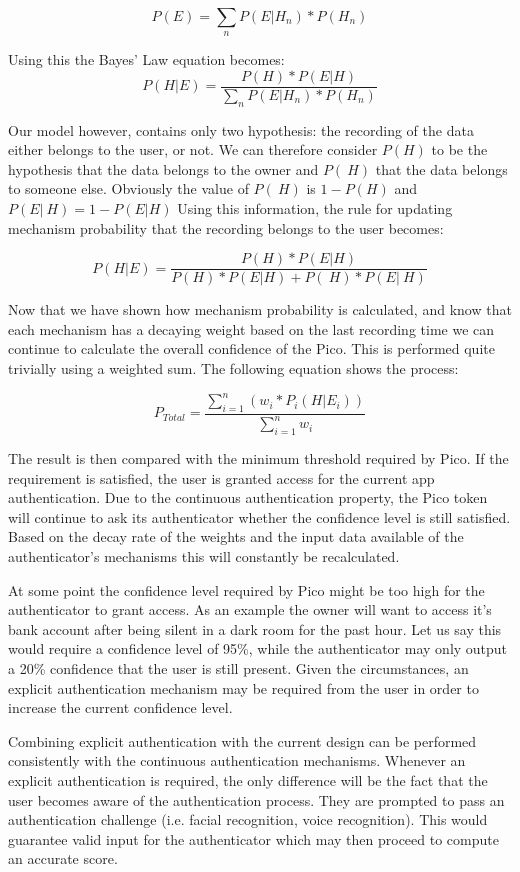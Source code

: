 $$P(E) = \sum_{n}^{}P(E|H_n) * P(H_n)$$

Using this the Bayes' Law equation becomes:
$$P(H|E) = \frac{P(H) * P(E|H)}{\sum_{n}^{}P(E|H_n) * P(H_n)}$$

Our model however, contains only two hypothesis: the recording of the data either belongs to the user, or not. We can therefore consider $P(H)$ to be the hypothesis that the data belongs to the owner and $P(~H)$ that the data belongs to someone else. Obviously the value of $P(~H)$ is $1 - P(H)$ and $P(E|~H) = 1 - P(E|H)$ Using this information, the rule for updating mechanism probability that the recording belongs to the user becomes:

$$P(H|E) = \frac{P(H) * P(E|H)}{P(H) * P(E|H) + P(~H) * P(E|~H)}$$

Now that we have shown how mechanism probability is calculated, and know that each mechanism has a decaying weight based on the last recording time we can continue to calculate the overall confidence of the Pico. This is performed quite trivially using a weighted sum. The following equation shows the process:

$$P_{Total} = \frac{\sum_{i=1}^{n}(w_i * P_i(H|E_i))}{\sum_{i=1}^{n}w_i}$$

The result is then compared with the minimum threshold required by Pico. If the requirement is satisfied, the user is granted access for the current app authentication. Due to the continuous authentication property, the Pico token will continue to ask its authenticator whether the confidence level is still satisfied. Based on the decay rate of the weights and the input data available of the authenticator's mechanisms this will constantly be recalculated.

At some point the confidence level required by Pico might be too high for the authenticator to grant access. As an example the owner will want to access it's bank account after being silent in a dark room for the past hour. Let us say this would require a confidence level of 95\%, while the authenticator may only output a 20\% confidence that the user is still present. Given the circumstances, an explicit authentication mechanism may be required from the user in order to increase the current confidence level. 

Combining explicit authentication with the current design can be performed consistently with the continuous authentication mechanisms. Whenever an explicit authentication is required, the only difference will be the fact that the user becomes aware of the authentication process. They are prompted to pass an authentication challenge (i.e. facial recognition, voice recognition). This would guarantee valid input for the authenticator which may then proceed to compute an accurate score.


